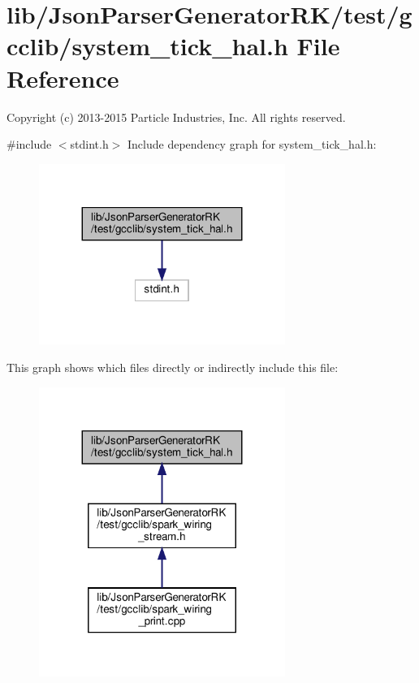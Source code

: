 \section{lib/\+Json\+Parser\+Generator\+R\+K/test/gcclib/system\+\_\+tick\+\_\+hal.h File Reference}
\label{system__tick__hal_8h}


Copyright (c) 2013-\/2015 Particle Industries, Inc. All rights reserved.  


{\ttfamily \#include $<$stdint.\+h$>$}\newline
Include dependency graph for system\+\_\+tick\+\_\+hal.\+h\+:\nopagebreak
\begin{figure}[H]
\begin{center}
\leavevmode
\includegraphics[width=227pt]{system__tick__hal_8h__incl}
\end{center}
\end{figure}
This graph shows which files directly or indirectly include this file\+:\nopagebreak
\begin{figure}[H]
\begin{center}
\leavevmode
\includegraphics[width=227pt]{system__tick__hal_8h__dep__incl}
\end{center}
\end{figure}
